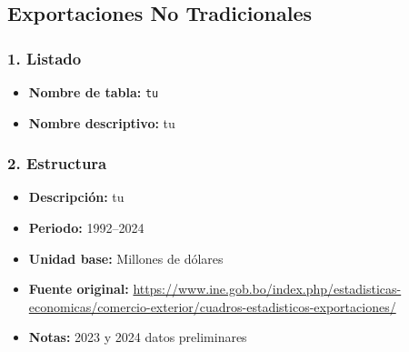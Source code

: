\documentclass[12pt,a4paper]{article}
\begin{document}
\subsection{Exportaciones No Tradicionales}

\subsubsection*{1. Listado}
\begin{itemize}
  \item \textbf{Nombre de tabla:} \texttt{tu}
  \item \textbf{Nombre descriptivo:} tu
\end{itemize}

\subsubsection*{2. Estructura}
\begin{itemize}
  \item \textbf{Descripción:} tu
  \item \textbf{Periodo:} 1992--2024
  \item \textbf{Unidad base:} Millones de dólares
  \item \textbf{Fuente original:} \url{https://www.ine.gob.bo/index.php/estadisticas-economicas/comercio-exterior/cuadros-estadisticos-exportaciones/}
  \item \textbf{Notas:} 2023 y 2024 datos preliminares
\end{itemize}
\end{document}
